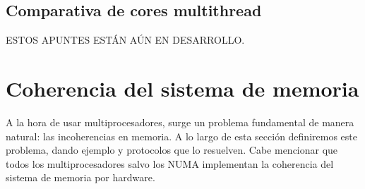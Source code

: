 \subsection{Comparativa de cores multithread}
ESTOS APUNTES ESTÁN AÚN EN DESARROLLO.


















































% 
% 
% 
% 

\newpage
\section{Coherencia del sistema de memoria}
A la hora de usar multiprocesadores, surge un problema fundamental de manera natural: las incoherencias en memoria. A lo largo de esta sección definiremos este problema, dando ejemplo y protocolos que lo resuelven. Cabe mencionar que todos los multiprocesadores salvo los NUMA implementan la coherencia del sistema de memoria por hardware.

